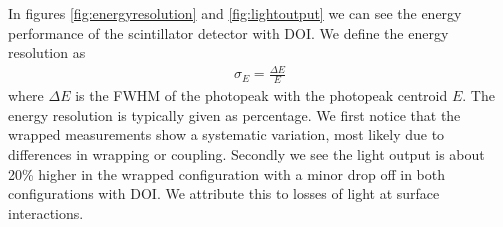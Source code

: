 In figures \ref{fig:energyresolution} and \ref{fig:lightoutput} we can see the energy performance of the scintillator detector with DOI. We define the energy resolution as
\begin{align}
\sigma_E = \frac{\Delta E}{E}
\end{align}
where $\Delta E$ is the FWHM of the photopeak with the photopeak centroid $E$. The energy resolution is typically given as percentage. We first notice that the wrapped measurements show a systematic variation, most likely due to differences in wrapping or coupling. Secondly we see the light output is about 20\% higher in the wrapped configuration with a minor drop off in both configurations with DOI. We attribute this to losses of light at surface interactions.